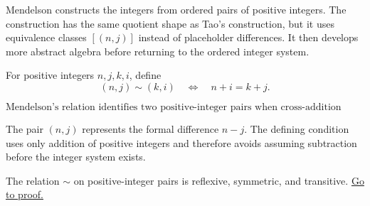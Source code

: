 
\begin{remark*}[Exposition]
Mendelson constructs the integers from ordered pairs of positive integers.
The construction has the same quotient shape as Tao's construction, but it
uses equivalence classes \([(n,j)]\) instead of placeholder differences. It
then develops more abstract algebra before returning to the ordered integer
system.
\end{remark*}

\begin{definition}
\label{def:men-equivalence-relation}
For positive integers \(n,j,k,i\), define
\[
  (n,j)\sim(k,i)
  \quad\Longleftrightarrow\quad
  n+i=k+j.
\]
\end{definition}




\begin{remark*}
\[
  \text{Mendelson's relation identifies two positive-integer pairs when
  cross-addition agrees.}
\]
\end{remark*}

\begin{remark*}[Interpretation]
The pair \((n,j)\) represents the formal difference \(n-j\). The defining
condition uses only addition of positive integers and therefore avoids
assuming subtraction before the integer system exists.
\end{remark*}

\DefinitionalRoot

\begin{theorem}
\label{thm:men-equiv}
The relation \(\sim\) on positive-integer pairs is reflexive, symmetric, and
transitive.
\hyperref[prf:men-equiv]{Go to proof.}
\end{theorem}


